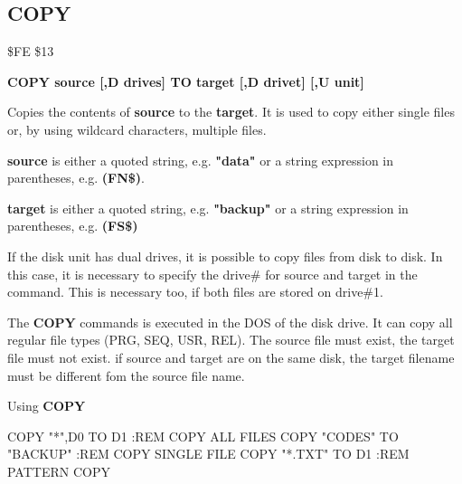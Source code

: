 \subsection{COPY}
\begin{description}[leftmargin=3cm,style=nextline]
\item [Token:] \$FE \$13
\item [Format:] {\bf COPY source [,D drives] TO
                target [,D drivet] [,U unit] }
\item [Usage:]
   Copies the contents of
   {\bf source} to the {\bf target}.
   It is used to copy either single files or, by using
   wildcard characters, multiple files.

   {\bf source} is either a quoted string, e.g. {\bf "data"} or
   a string expression in parentheses, e.g. {\bf (FN\$)}.

   {\bf target} is either a quoted string, e.g. {\bf "backup"} or
   a string expression in parentheses, e.g. {\bf (FS\$)}

   If the disk unit has dual drives, it is possible to copy
   files from disk to disk.
   In this case, it is necessary to specify the drive\#
   for source and target in the command. This is necessary too, if both
   files are stored on drive\#1.

   \drivedefinition

   \unitdefinition

\item [Remarks:]
   The {\bf COPY} commands is executed in the DOS of the disk drive.
   It can copy all regular file types (PRG, SEQ, USR, REL).
   The source file must exist, the target file must not exist.
   if source and target are on the same disk, the target filename
   must be different fom the source file name.

\item [Example:] Using {\bf COPY}
\begin{screenoutput}
  COPY "*",D0 TO D1        :REM COPY ALL FILES
  COPY "CODES" TO "BACKUP" :REM COPY SINGLE FILE
  COPY "*.TXT" TO D1       :REM PATTERN COPY
\end{screenoutput}
\end{description}


\newpage
